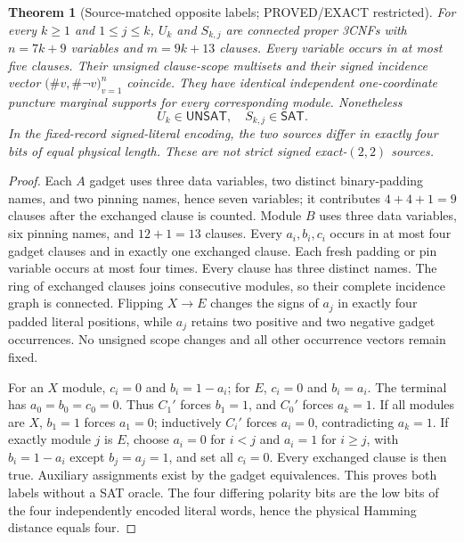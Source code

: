 \documentclass[11pt]{article}
\newtheorem{theorem}{Theorem}
\newcommand{\SAT}{\mathsf{SAT}}
\newcommand{\UNSAT}{\mathsf{UNSAT}}
\begin{document}
\begin{theorem}[Source-matched opposite labels; PROVED/EXACT restricted]\label{th:main}
For every $k\ge1$ and $1\le j\le k$, $U_k$ and $S_{k,j}$ are connected proper 3CNFs with $n=7k+9$ variables and $m=9k+13$ clauses. Every variable occurs in at most five clauses. Their unsigned clause-scope multisets and their signed incidence vector $\bigl(\#v,\#\neg v\bigr)_{v=1}^n$ coincide. They have identical independent one-coordinate puncture marginal supports for every corresponding module. Nonetheless
\[
\boxed{U_k\in\UNSAT,\quad S_{k,j}\in\SAT}.\tag{2}
\]
In the fixed-record signed-literal encoding, the two sources differ in exactly \emph{four} bits of equal physical length. These are not strict signed exact-$(2,2)$ sources.
\end{theorem}
\begin{proof}
Each $A$ gadget uses three data variables, two distinct binary-padding names, and two pinning names, hence seven variables; it contributes $4+4+1=9$ clauses after the exchanged clause is counted. Module $B$ uses three data variables, six pinning names, and $12+1=13$ clauses. Every $a_i,b_i,c_i$ occurs in at most four gadget clauses and in exactly one exchanged clause. Each fresh padding or pin variable occurs at most four times. Every clause has three distinct names. The ring of exchanged clauses joins consecutive modules, so their complete incidence graph is connected. Flipping $X\to E$ changes the signs of $a_j$ in exactly four padded literal positions, while $a_j$ retains two positive and two negative gadget occurrences. No unsigned scope changes and all other occurrence vectors remain fixed.

For an $X$ module, $c_i=0$ and $b_i=1-a_i$; for $E$, $c_i=0$ and $b_i=a_i$. The terminal has $a_0=b_0=c_0=0$. Thus $C_1'$ forces $b_1=1$, and $C_0'$ forces $a_k=1$. If all modules are $X$, $b_1=1$ forces $a_1=0$; inductively $C_i'$ forces $a_i=0$, contradicting $a_k=1$. If exactly module $j$ is $E$, choose $a_i=0$ for $i<j$ and $a_i=1$ for $i\ge j$, with $b_i=1-a_i$ except $b_j=a_j=1$, and set all $c_i=0$. Every exchanged clause is then true. Auxiliary assignments exist by the gadget equivalences. This proves both labels without a SAT oracle. The four differing polarity bits are the low bits of the four independently encoded literal words, hence the physical Hamming distance equals four.
\end{proof}
\end{document}

